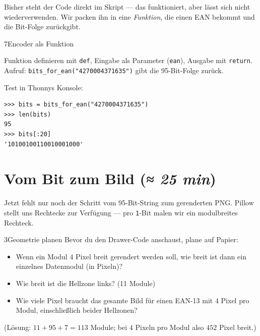 Bisher steht der Code direkt im Skript — das funktioniert, aber lässt
sich nicht wiederverwenden. Wir packen ihn in eine \emph{Funktion},
die einen EAN bekommt und die Bit-Folge zurückgibt.

\begin{pythoneinheit}{7}{Encoder als Funktion}

Funktion definieren mit \texttt{def}, Eingabe als Parameter
(\texttt{ean}), Ausgabe mit \texttt{return}. Aufruf:
\texttt{bits\_for\_ean("4270004371635")} gibt die 95-Bit-Folge zurück.

Test in Thonnys Konsole:

\begin{verbatim}
>>> bits = bits_for_ean("4270004371635")
>>> len(bits)
95
>>> bits[:20]
'10100100110010001000'
\end{verbatim}
\end{pythoneinheit}

\section{Vom Bit zum Bild \normalfont(\textit{≈ 25 min})}

Jetzt fehlt nur noch der Schritt vom 95-Bit-String zum gerenderten
PNG. Pillow stellt uns Rechtecke zur Verfügung — pro \texttt{1}-Bit
malen wir ein modulbreites Rechteck.

\begin{bleistiftuebung}{3}{Geometrie planen}
Bevor du den Drawer-Code anschaust, plane auf Papier:

\begin{itemize}
\item Wenn ein Modul $4$ Pixel breit gerendert werden soll, wie breit
  ist dann ein einzelnes Datenmodul (in Pixeln)?
\item Wie breit ist die Hellzone links? (11 Module)
\item Wie viele Pixel braucht das gesamte Bild für einen EAN-13 mit
  $4$ Pixel pro Modul, einschließlich beider Hellzonen?
\end{itemize}

(Lösung: $11 + 95 + 7 = 113$ Module; bei $4$ Pixeln pro Modul also
$452$ Pixel breit.)
\end{bleistiftuebung}

